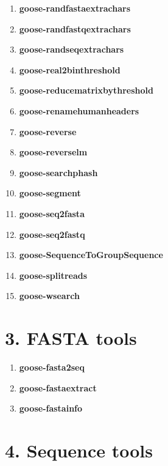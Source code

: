 \documentclass[11pt,journal,compsoc]{report}[1]
\begin{document}
\begin{enumerate}
\item \textbf{goose-randfastaextrachars}
\item \textbf{goose-randfastqextrachars}
\item \textbf{goose-randseqextrachars}
\item \textbf{goose-real2binthreshold}
\item \textbf{goose-reducematrixbythreshold}
\item \textbf{goose-renamehumanheaders}
\item \textbf{goose-reverse}
\item \textbf{goose-reverselm}
\item \textbf{goose-searchphash}
\item \textbf{goose-segment}
\item \textbf{goose-seq2fasta}
\item \textbf{goose-seq2fastq}
\item \textbf{goose-SequenceToGroupSequence}
\item \textbf{goose-splitreads}

\item \textbf{goose-wsearch}
\end{enumerate}

\chapter*{3. FASTA tools}
\label{fasta}

\begin{enumerate}
\item \textbf{goose-fasta2seq}
\item \textbf{goose-fastaextract}
\item \textbf{goose-fastainfo}
\end{enumerate}

\chapter*{4. Sequence tools}
\label{seq}
\end{document}
